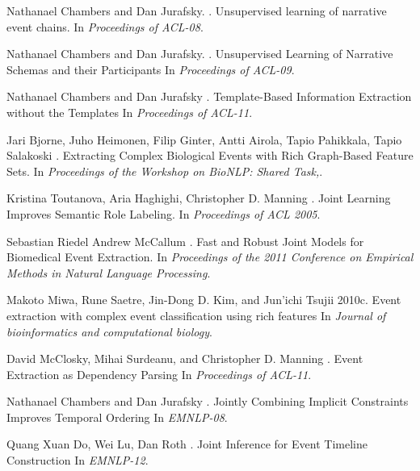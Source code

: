 \documentclass[11pt]{article}
\begin{document}
%
%
\begin{thebibliography}{}

Nathanael Chambers and Dan Jurafsky.
.
\newblock Unsupervised learning of narrative event chains.
\newblock In {\em Proceedings of ACL-08}.

Nathanael Chambers and Dan Jurafsky.
.
\newblock Unsupervised Learning of Narrative Schemas and their Participants
\newblock In {\em Proceedings of ACL-09}.

Nathanael Chambers and Dan Jurafsky
.
\newblock Template-Based Information Extraction without the Templates
\newblock In {\em Proceedings of ACL-11}.

Jari Bjorne, Juho Heimonen, Filip Ginter, Antti Airola, Tapio Pahikkala, Tapio Salakoski
.
\newblock Extracting Complex Biological Events with Rich Graph-Based Feature Sets.
\newblock In {\em Proceedings of the Workshop on BioNLP: Shared Task,}.

Kristina Toutanova, Aria Haghighi, Christopher D. Manning
.
\newblock Joint Learning Improves Semantic Role Labeling.
\newblock In {\em Proceedings of ACL 2005}.

Sebastian Riedel Andrew McCallum
.
\newblock Fast and Robust Joint Models for Biomedical Event Extraction.
\newblock In {\em Proceedings of the 2011 Conference on Empirical Methods in Natural Language Processing}.

Makoto Miwa, Rune Saetre, Jin-Dong D. Kim, and Jun’ichi Tsujii
\newblock 2010c.
\newblock Event extraction with complex event classification using rich features
\newblock In {\em Journal of bioinformatics and computational biology}.

David McClosky, Mihai Surdeanu, and Christopher D. Manning
.
\newblock Event Extraction as Dependency Parsing
\newblock In {\em Proceedings of ACL-11}.

Nathanael Chambers and Dan Jurafsky
.
\newblock Jointly Combining Implicit Constraints Improves Temporal Ordering
\newblock In {\em EMNLP-08}.

Quang Xuan Do, Wei Lu, Dan Roth
.
\newblock Joint Inference for Event Timeline Construction
\newblock In {\em EMNLP-12}.

\end{thebibliography}
\end{document}

